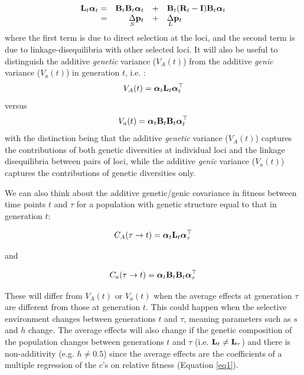 \documentclass[12pt]{article}
\begin{document}
\begin{bibunit}
\begin{equation}
\begin{array}{rrcl}
{\bf L}_t\boldsymbol{\alpha}_t =& {\bf B}_t{\bf B}_t\boldsymbol{\alpha}_t&+&{\bf B}_t({\bf R}_t-{\bf I}){\bf B}_t\boldsymbol{\alpha}_t\\
=&\underset{S}\Delta {\bf p}_t&+&\underset{L}\Delta {\bf p}_t
\end{array}
\end{equation}
where the first term is due to direct selection at the loci, and the second term is due to linkage-disequilibria with other selected loci. It will also be useful to distinguish the additive \textit{genetic} variance ($V_A(t)$) from the additive \textit{genic} variance  ($V_a(t)$) in generation $t$, i.e. :
\begin{equation}
V_A(t) = \boldsymbol{\alpha}_t{\bf L}_t\boldsymbol{\alpha}^{\top}_t
\end{equation}
versus
\begin{equation}
V_a(t) = \boldsymbol{\alpha}_t{\bf B}_t{\bf B}_t\boldsymbol{\alpha}^{\top}_t
\end{equation}
with the distinction being that the additive \emph{genetic} variance ($V_A(t)$) captures the contributions of both genetic diversities at individual loci and the linkage disequilibria between pairs of loci, while the additive \emph{genic} variance ($V_a(t)$) captures the contributions of genetic diversities only.

We can also think about the additive genetic/genic covariance in fitness between time points $t$ and $\tau$ for a population with genetic structure equal to that in generation $t$:

\begin{equation}
C_A(\tau\rightarrow t) = \boldsymbol{\alpha}_{t}{\bf L}_t\boldsymbol{\alpha}^{\top}_{\tau}
\end{equation}

and

\begin{equation}
C_a(\tau\rightarrow t) = \boldsymbol{\alpha}_{t}{\bf B}_t{\bf B}_t\boldsymbol{\alpha}^{\top}_{\tau}
\end{equation}

These will differ from $V_A(t)$ or $V_a(t)$ when the average effects at generation $\tau$ are different from those at generation $t$. This could happen when the selective environment changes between generations $t$ and $\tau$, meaning parameters such as $s$ and $h$ change. The average effects will also change if the genetic composition of the population changes between generations $t$ and $\tau$ (i.e. ${\bf L}_{t}\neq{\bf L}_{\tau}$) and there is non-additivity (e.g. $h\neq0.5$) since the average effects are the coefficients of a multiple regression of the $c$'s on relative fitness (Equation \ref{eq1}).\\


\end{bibunit}
\end{document}
